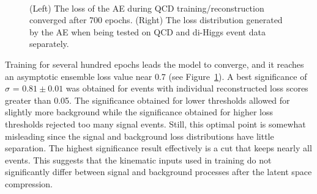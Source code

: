 \begin{figure}[!h] 
  \begin{center}
    \\
    \caption{(Left) The loss of the AE during QCD training/reconstruction converged after 700 epochs. (Right) The loss distribution generated by the AE when being tested on QCD and di-Higgs event data separately.}    
  \label{fig:ae_trainPredLoss}
\end{center}
\end{figure}

Training for several hundred epochs leads the model to converge, and it reaches an asymptotic ensemble loss value near 0.7 (see Figure~\ref{fig:ae_trainPredLoss}). A best significance of $\sigma$ = $0.81\pm 0.01$ was obtained for events with individual reconstructed loss scores greater than 0.05. The significance obtained for lower thresholds allowed for slightly more background while the significance obtained for higher loss thresholds rejected too many signal events. Still, this optimal point is somewhat misleading since the signal and background loss distributions have little separation. The highest significance result effectively is a cut that keeps nearly all events. This suggests that the kinematic inputs used in training do not significantly differ between signal and background processes after the latent space compression.


